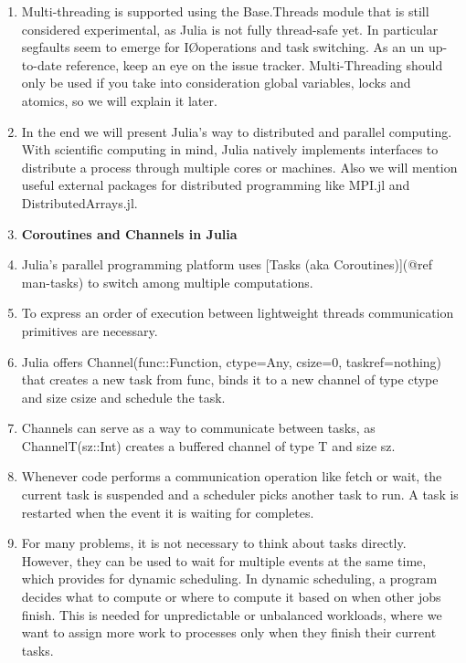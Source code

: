 \begin{enumerate}
	\item Multi-threading is supported using the Base.Threads module that is still considered experimental, as Julia is not fully thread-safe yet. In particular segfaults seem to emerge for I\O operations and task switching. As an un up-to-date reference, keep an eye on the issue tracker. Multi-Threading should only be used if you take into consideration global variables, locks and atomics, so we will explain it later.
	
	\item In the end we will present Julia's way to distributed and parallel computing. With scientific computing in mind, Julia natively implements interfaces to distribute a process through multiple cores or machines. Also we will mention useful external packages for distributed programming like MPI.jl and DistributedArrays.jl.
	
	\item \textbf{Coroutines and Channels in Julia}

	\item Julia's parallel programming platform uses [Tasks (aka Coroutines)](@ref man-tasks) to switch among multiple computations. 
	
	\item To express an order of execution between lightweight threads communication primitives are necessary. 
	
	\item Julia offers Channel(func::Function, ctype=Any, csize=0, taskref=nothing) that creates a new task from func, binds it to a new channel of type ctype and size csize and schedule the task. 
	
	\item Channels can serve as a way to communicate between tasks, as Channel{T}(sz::Int) creates a buffered channel of type T and size sz. 
	
	\item Whenever code performs a communication operation like fetch or wait, the current task is suspended and a scheduler picks another task to run. A task is restarted when the event it is waiting for completes.
	
	\item For many problems, it is not necessary to think about tasks directly. However, they can be used to wait for multiple events at the same time, which provides for dynamic scheduling. In dynamic scheduling, a program decides what to compute or where to compute it based on when other jobs finish. This is needed for unpredictable or unbalanced workloads, where we want to assign more work to processes only when they finish their current tasks.
	

\end{enumerate}
